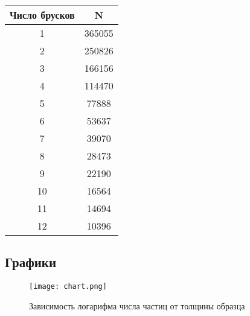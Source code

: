 \documentclass[12pt, a4paper, reqno]{article}
\begin{document}
        \begin{minipage}{0.33\textwidth}
            \centering
            \begin{tabular}{|c|c|}
                \hline
                Число брусков & N       \\ \hline\hline
                1             & 365055  \\ \hline
                2             & 250826  \\ \hline
                3             & 166156  \\ \hline
                4             & 114470  \\ \hline
                5             & 77888   \\ \hline
                6             & 53637   \\ \hline
                7             & 39070   \\ \hline
                8             & 28473   \\ \hline
                9             & 22190   \\ \hline
                10            & 16564   \\ \hline
                11            & 14694   \\ \hline
                12            & 10396   \\ \hline
            \end{tabular}
            \label{table:Pb}
        \end{minipage}

\newpage

    \subsection{Графики}

        \begin{figure}[H]
            \centering
            \caption{Зависимость логарифма числа частиц от толщины образца}
            \texttt{[image: chart.png]}
            \label{fig:chart}
        \end{figure}
\end{document}
